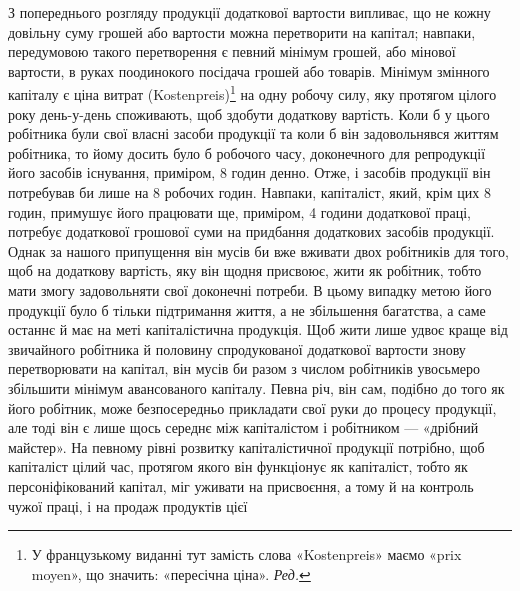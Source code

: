 З попереднього розгляду продукції додаткової вартости випливає,
що не кожну довільну суму грошей або вартости можна
перетворити на капітал; навпаки, передумовою такого перетворення
є певний мінімум грошей, або мінової вартости, в руках
поодинокого посідача грошей або товарів. Мінімум змінного капіталу
є ціна витрат (Kostenpreis)\footnote*{
У французькому виданні тут замість слова «Kostenpreis» маємо
«prix moyen», що значить: «пересічна ціна». \emph{Ред.}
} на одну робочу силу, яку протягом
цілого року день-у-день споживають, щоб здобути додаткову
вартість. Коли б у цього робітника були свої власні засоби
продукції та коли б він задовольнявся життям робітника,
то йому досить було б робочого часу, доконечного для репродукції
його засобів існування, приміром, 8 годин денно. Отже, і
засобів продукції він потребував би лише на 8 робочих годин.
Навпаки, капіталіст, який, крім цих 8 годин, примушує його
працювати ще, приміром, 4 години додаткової праці, потребує
додаткової грошової суми на придбання додаткових засобів продукції.
Однак за нашого припущення він мусів би вже вживати
двох робітників для того, щоб на додаткову вартість, яку він
щодня присвоює, жити як робітник, тобто мати змогу задовольняти
свої доконечні потреби. В цьому випадку метою його продукції
було б тільки підтримання життя, а не збільшення багатства,
а саме останнє й має на меті капіталістична продукція.
Щоб жити лише удвоє краще від звичайного робітника й половину
спродукованої додаткової вартости знову перетворювати
на капітал, він мусів би разом з числом робітників увосьмеро
збільшити мінімум авансованого капіталу. Певна річ, він сам,
подібно до того як його робітник, може безпосередньо прикладати
свої руки до процесу продукції, але тоді він є лише щось середнє
між капіталістом і робітником — «дрібний майстер». На певному
рівні розвитку капіталістичної продукції потрібно, щоб капіталіст
цілий час, протягом якого він функціонує як капіталіст,
тобто як персоніфікований капітал, міг уживати на присвоєння,
а тому й на контроль чужої праці, і на продаж продуктів цієї

